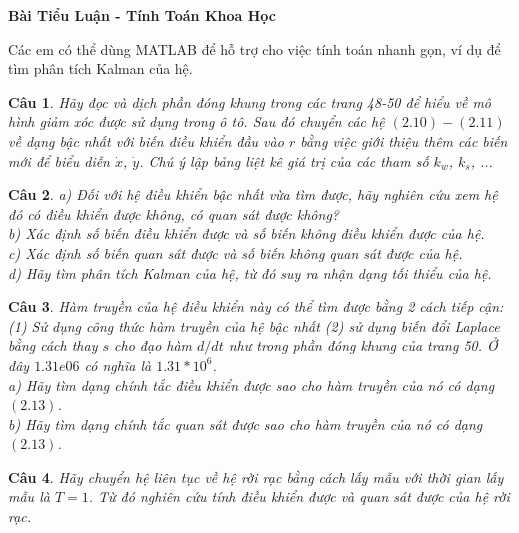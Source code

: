 \documentclass[11pt]{article}
\newtheorem{bt}{Câu}
\begin{document}



\begin{center}
	{\bf Bài Tiểu Luận - Tính Toán Khoa Học}
\end{center}

Các em có thể dùng MATLAB để hỗ trợ cho việc tính toán nhanh gọn, ví dụ để tìm phân tích Kalman của hệ.

\begin{bt}
Hãy đọc và dịch phần đóng khung trong các trang 48-50 để hiểu về mô hình giảm xóc được sử dụng trong ô tô. Sau đó chuyển các hệ $(2.10)-(2.11)$ về dạng bậc nhất với biến điều khiển đầu vào $r$ bằng việc giới thiệu thêm các biến mới để biểu diễn $\dot{x}$, $\dot{y}$.  
Chú ý lập bảng liệt kê giá trị của các tham số $k_w$, $k_s$, ...
\end{bt}

\begin{bt}
a) Đối với hệ điều khiển bậc nhất vừa tìm được, hãy nghiên cứu xem hệ đó có điều khiển được không, có quan sát được không? \\
b) Xác định số biến điều khiển được và số biến không điều khiển được của hệ. \\
c) Xác định số biến quan sát được và số biến không quan sát được của hệ. \\
d) Hãy tìm phân tích Kalman của hệ, từ đó suy ra nhận dạng tối thiểu của hệ. 
\end{bt}

\begin{bt}
Hàm truyền của hệ điều khiển này có thể tìm được bằng 2 cách tiếp cận: (1) Sử dụng công thức hàm truyền của hệ bậc nhất (2) sử dụng biến đổi Laplace bằng cách thay $s$ cho đạo hàm $d/dt$ như trong phần đóng khung của trang 50. Ở đây $1.31e06$ có nghĩa là $1.31 * 10^6$. \\
a) Hãy tìm dạng chính tắc điều khiển được sao cho hàm truyền của nó có dạng $(2.13)$. \\
b) Hãy tìm dạng chính tắc quan sát được sao cho hàm truyền của nó có dạng $(2.13)$. 
\end{bt}

\begin{bt}
Hãy chuyển hệ liên tục về hệ rời rạc bằng cách lấy mẫu với thời gian lấy mẫu là $T = 1$. Từ đó nghiên cứu tính điều khiển được và quan sát được của hệ rời rạc.
\end{bt}
\end{document}
